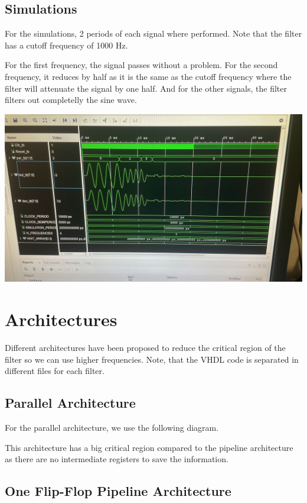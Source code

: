 \documentclass[a4paper, 12pt]{article}
\begin{document}
\subsection{Simulations}
\label{sec:org76c61fd}

For the simulations, 2 periods of each signal where performed. Note that the filter has a cutoff frequency of 1000 Hz.

For the first frequency, the signal passes without a problem. For the second frequency, it reduces by half as it is the same as the cutoff frequency where the filter will attenuate the signal by one half. And for the other signals, the filter filters out completelly the sine wave.

\begin{center}
\includegraphics[width=.9\linewidth]{./img/simulation.jpg}
\end{center}
\section{Architectures}
\label{sec:org6336008}

Different architectures have been proposed to reduce the critical region of the filter so we can use higher frequencies. Note, that the VHDL code is separated in different files for each filter.
\subsection{Parallel Architecture}
\label{sec:org03e821b}

For the parallel architecture, we use the following diagram.

This architecture has a big critical region compared to the pipeline architecture as there are no intermediate registers to save the information.
\subsection{One Flip-Flop Pipeline Architecture}
\label{sec:org19951ec}
\end{document}
